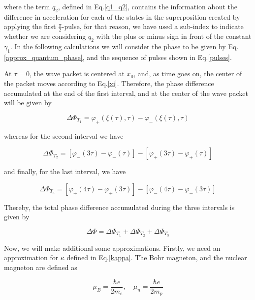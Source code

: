 \documentclass{article}
\begin{document}
where the term $q_{2}$, defined in Eq.\ref{q1_q2}, contains the information about the difference in acceleration for each of the states in the superposition created by applying the first $\frac{\pi}{2}$-pulse, for that reason, we have used a sub-index to indicate whether we are considering $q_{2}$ with the plus or minus sign in front of the constant $\gamma_{1}$. In the following calculations we will consider the phase to be given by Eq.\ref{approx_quantum_phase}, and the sequence of pulses shown in Eq.\ref{pulses}.

At $\tau=0$, the wave packet is centered at $x_{0}$, and, as time goes on, the center of the packet moves according to Eq.\ref{xi}.
Therefore, the phase difference accumulated at the end of the first interval, and at the center of the wave packet will be given by

\begin{equation}
\Delta \Phi_{T_{1}} = \varphi_{+}(\xi(\tau), \tau) - \varphi_{-}(\xi(\tau), \tau)
\end{equation}

whereas for the second interval we have

\begin{equation}
\Delta \Phi_{T_{2}} = [\varphi_{-}(3\tau) - \varphi_{-}(\tau)] - [\varphi_{+}(3\tau) - \varphi_{+}(\tau)]
\end{equation}

and finally, for the last interval, we have

\begin{equation}
\Delta \Phi_{T_{3}} = [\varphi_{+}(4\tau) - \varphi_{+}(3\tau)] - [\varphi_{-}(4\tau) - \varphi_{-}(3\tau)]
\end{equation}

Thereby, the total phase difference accumulated during the three intervals is given by 

\begin{equation}\label{pre_total_quantum_phase}
\Delta \Phi = \Delta \Phi_{T_{1}} + \Delta \Phi_{T_{2}} + \Delta \Phi_{T_{3}} 
\end{equation}

Now, we will make additional some approximations. Firstly, we need an approximation for $\kappa$ defined in Eq.\ref{kappa}. The Bohr magneton, and the nuclear magneton are defined as

\begin{equation}
\mu_{B} = \frac{\hbar e}{2 m_{e}} \mathrm{,}\quad \mu_{n} = \frac{\hbar e}{2 m_{p}}
\end{equation}
\end{document}
